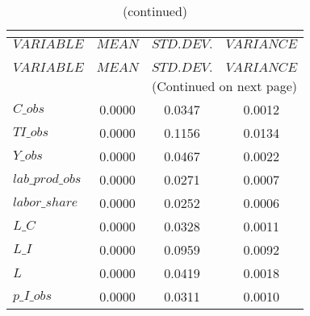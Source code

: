  
\begin{center}
\begin{longtable}{lccc} 
\caption{THEORETICAL MOMENTS}\\
 \label{Table:th_moments}\\
\toprule 
$VARIABLE        $	 & 	 $         MEAN$	 & 	 $    STD. DEV.$	 & 	 $     VARIANCE$\\
\midrule \endfirsthead 
\caption{(continued)}\\
 \toprule \\ 
$VARIABLE        $	 & 	 $         MEAN$	 & 	 $    STD. DEV.$	 & 	 $     VARIANCE$\\
\midrule \endhead 
\midrule \multicolumn{4}{r}{(Continued on next page)} \\ \bottomrule \endfoot 
\bottomrule \endlastfoot 
$C\_obs          $	 & 	       0.0000	 & 	       0.0347	 & 	       0.0012 \\ 
$TI\_obs         $	 & 	       0.0000	 & 	       0.1156	 & 	       0.0134 \\ 
$Y\_obs          $	 & 	       0.0000	 & 	       0.0467	 & 	       0.0022 \\ 
$lab\_prod\_obs  $	 & 	       0.0000	 & 	       0.0271	 & 	       0.0007 \\ 
$labor\_share    $	 & 	       0.0000	 & 	       0.0252	 & 	       0.0006 \\ 
$L\_C            $	 & 	       0.0000	 & 	       0.0328	 & 	       0.0011 \\ 
$L\_I            $	 & 	       0.0000	 & 	       0.0959	 & 	       0.0092 \\ 
$L               $	 & 	       0.0000	 & 	       0.0419	 & 	       0.0018 \\ 
$p\_I\_obs       $	 & 	       0.0000	 & 	       0.0311	 & 	       0.0010 \\ 
\end{longtable}
 \end{center}

